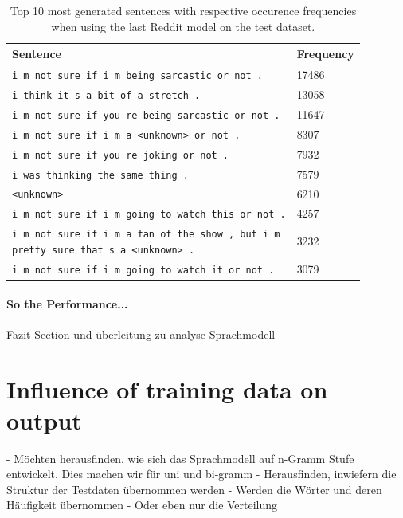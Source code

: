\begin{table}[H]
	\centering
	\begin{adjustbox}{max width=\textwidth}
		\begin{tabular}{ll}
			\toprule
			Sentence & Frequency\\ \midrule
			\texttt{i m not sure if i m being sarcastic or not .} & 17486\\
			\texttt{i think it s a bit of a stretch .} & 13058\\
			\texttt{i m not sure if you re being sarcastic or not .} & 11647\\
			\texttt{i m not sure if i m a <unknown> or not .} & 8307\\
			\texttt{i m not sure if you re joking or not .} & 7932\\
			\texttt{i was thinking the same thing .} & 7579\\
			\texttt{<unknown>} & 6210\\
			\texttt{i m not sure if i m going to watch this or not .} & 4257\\
			\specialcell{\texttt{i m not sure if i m a fan of the show , but i m}\\\texttt{pretty sure that s a <unknown> .}} & 3232\\
			\texttt{i m not sure if i m going to watch it or not .} & 3079\\
			\bottomrule
		\end{tabular}
	\end{adjustbox}
	\caption{Top 10 most generated sentences with respective occurence frequencies when using the last Reddit model on the test dataset.}
	\label{results:test_performance:reddit_sample_outputs}
\end{table}

\paragraph{So the Performance...} Fazit Section und überleitung zu analyse Sprachmodell

\section{Influence of training data on output}
- Möchten herausfinden, wie sich das Sprachmodell auf n-Gramm Stufe entwickelt. Dies machen wir für uni und bi-gramm
- Herausfinden, inwiefern die Struktur der Testdaten übernommen werden
	- Werden die Wörter und deren Häufigkeit übernommen
	- Oder eben nur die Verteilung

